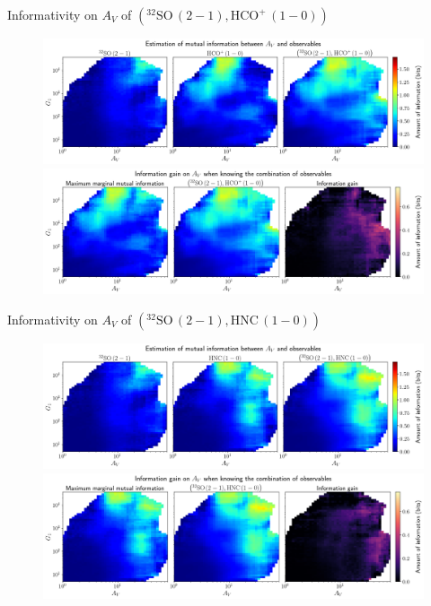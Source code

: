 \documentclass{beamer}
\begin{document}
\begin{frame}{Informativity on $A_V$ of $\left(\mathrm{^{32}SO\,(2-1)},\mathrm{HCO^+\,(1-0)}\right)$}
    \begin{figure}
        \centering
        \includegraphics[width=0.95\linewidth]{../mi/av__32so21_hcop10_mi.png}
        \vfill
        \includegraphics[width=0.95\linewidth]{../mi/av__32so21_hcop10_mi_gain.png}
    \end{figure}
\end{frame}

\begin{frame}{Informativity on $A_V$ of $\left(\mathrm{^{32}SO\,(2-1)},\mathrm{HNC\,(1-0)}\right)$}
    \begin{figure}
        \centering
        \includegraphics[width=0.95\linewidth]{../mi/av__32so21_hnc10_mi.png}
        \vfill
        \includegraphics[width=0.95\linewidth]{../mi/av__32so21_hnc10_mi_gain.png}
    \end{figure}
\end{frame}
\end{document}
